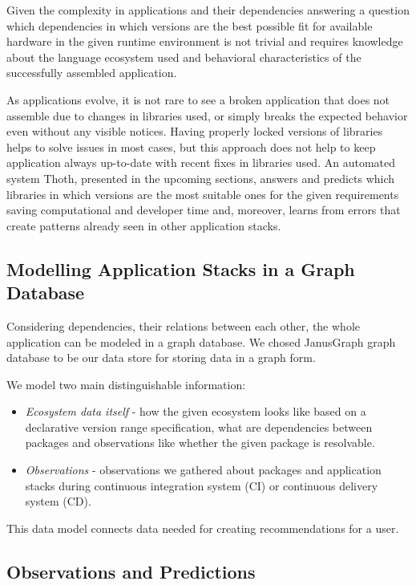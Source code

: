 \documentclass[a4paper]{llncs}
\begin{document}
Given the complexity in applications and their dependencies answering a question which dependencies in which versions are the best possible fit for available hardware in the given runtime environment is not trivial and requires knowledge about the language ecosystem used and behavioral characteristics of the successfully assembled application.

As applications evolve, it is not rare to see a broken application that does not assemble due to changes in libraries used, or simply breaks the expected behavior even without any visible notices. Having properly locked versions of libraries helps to solve issues in most cases, but this approach does not help to keep application always up-to-date with recent fixes in libraries used. An automated system Thoth, presented in the upcoming sections, answers and predicts which libraries in which versions are the most suitable ones for the given requirements saving computational and developer time and, moreover, learns from errors that create patterns already seen in other application stacks.

\subsection{Modelling Application Stacks in a Graph Database} \label{section_modelling_app_stacks}

Considering dependencies, their relations between each other, the whole application can be modeled in a graph database. We chosed JanusGraph graph database to be our data store for storing data in a graph form.

We model two main distinguishable information:

\begin{itemize}
  \item \emph{Ecosystem data itself} - how the given ecosystem looks like based on a declarative version range specification, what are dependencies between packages and observations like whether the given package is resolvable.
  \item \emph{Observations} - observations we gathered about packages and application stacks during continuous integration system (CI) or continuous delivery system (CD).
\end{itemize}

This data model connects data needed for creating recommendations for a user.

\subsection{Observations and Predictions}
\end{document}
